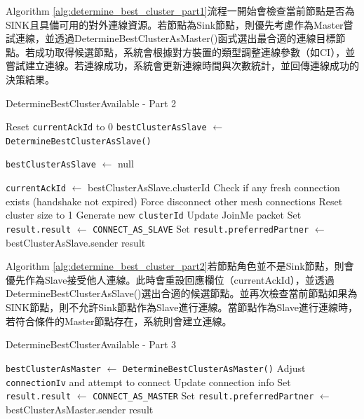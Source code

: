 \begin{ZhChapter}
Algorithm \ref{alg:determine_best_cluster_part1}流程一開始會檢查當前節點是否為SINK且具備可用的對外連線資源。若節點為Sink節點，則優先考慮作為Master嘗試連線，並透過DetermineBestClusterAsMaster()函式選出最合適的連線目標節點。若成功取得候選節點，系統會根據對方裝置的類型調整連線參數（如CI），並嘗試建立連線。若連線成功，系統會更新連線時間與次數統計，並回傳連線成功的決策結果。

\begin{algorithm}[H]
\caption{DetermineBestClusterAvailable - Part 2}
\label{alg:determine_best_cluster_part2}
\begin{algorithmic}[1]
    \State Reset \texttt{currentAckId} to 0
    \State \texttt{bestClusterAsSlave} $\gets$ \texttt{DetermineBestClusterAsSlave()}

        \State \texttt{bestClusterAsSlave} $\gets$ null
    \EndIf

        \State \texttt{currentAckId} $\gets$ bestClusterAsSlave.clusterId
            \State Check if any fresh connection exists (handshake not expired)
                    \State Force disconnect other mesh connections
                    \State Reset cluster size to 1
                    \State Generate new \texttt{clusterId}
                \EndIf
            \EndIf
        \EndIf
        \State Update JoinMe packet
        \State Set \texttt{result.result} $\gets$ \texttt{CONNECT\_AS\_SLAVE}
        \State Set \texttt{result.preferredPartner} $\gets$ bestClusterAsSlave.sender
        \State \Return result
    \EndIf
\end{algorithmic}
\end{algorithm}

Algorithm \ref{alg:determine_best_cluster_part2}若節點角色並不是Sink節點，則會優先作為Slave接受他人連線。此時會重設回應欄位（currentAckId），並透過DetermineBestClusterAsSlave()選出合適的候選節點。並再次檢查當前節點如果為SINK節點，則不允許Sink節點作為Slave進行連線。當節點作為Slave進行連線時，若符合條件的Master節點存在，系統則會建立連線。

\begin{algorithm}[H]
\caption{DetermineBestClusterAvailable - Part 3}
\label{alg:determine_best_cluster_part3}
\begin{algorithmic}[1]
\State \texttt{bestClusterAsMaster} $\gets$ \texttt{DetermineBestClusterAsMaster()}
    \State Adjust \texttt{connectionIv} and attempt to connect
        \State Update connection info
    \EndIf
    \State Set \texttt{result.result} $\gets$ \texttt{CONNECT\_AS\_MASTER}
    \State Set \texttt{result.preferredPartner} $\gets$ bestClusterAsMaster.sender
    \State \Return result
\EndIf


\end{algorithmic}
\end{algorithm}
\end{ZhChapter}
